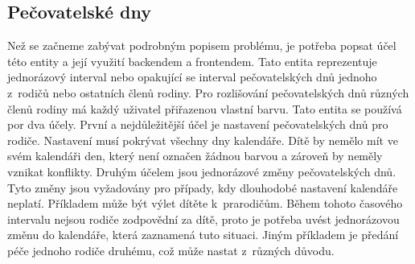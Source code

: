     \subsection{Pečovatelské dny}\label{analyza:pozadavky:caredays}
        Než se začneme zabývat podrobným popisem problému, je potřeba popsat účel této entity a její využití backendem a frontendem. Tato entita reprezentuje jednorázový interval nebo opakující se interval pečovatelských dnů jednoho z~rodičů nebo ostatních členů rodiny. Pro rozlišování pečovatelských dnů různých členů rodiny má každý uživatel přiřazenou vlastní barvu. Tato entita se používá por dva účely. První a nejdůležitější účel je nastavení pečovatelských dnů pro rodiče. Nastavení musí pokrývat všechny dny kalendáře. Dítě by nemělo mít ve svém kalendáři den, který není označen žádnou barvou a zároveň by neměly vznikat konflikty. Druhým účelem jsou jednorázové změny pečovatelských dnů. Tyto změny jsou vyžadovány pro případy, kdy dlouhodobé nastavení kalendáře neplatí. Příkladem může být výlet dítěte k~prarodičům. Během tohoto časového intervalu nejsou rodiče zodpovědní za dítě, proto je potřeba uvést jednorázovou změnu do kalendáře, která zaznamená tuto situaci. Jiným příkladem je předání péče jednoho rodiče druhému, což může nastat z~různých důvodu.


